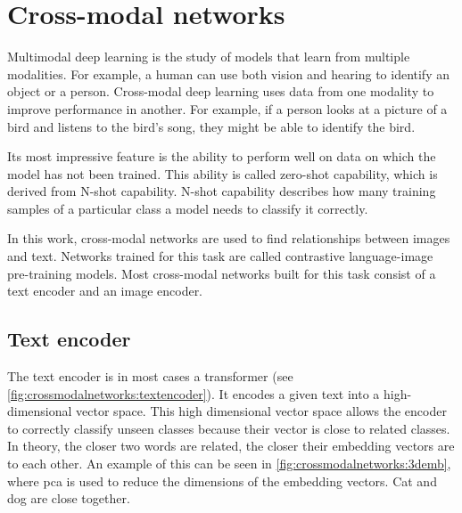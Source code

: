%
%
%


\chapter{Cross-modal networks
    \label{chapter:crossmodalnetworks}}
    Multimodal deep learning is the study of models that learn from multiple modalities.
    For example, a human can use both vision and hearing to identify an object or a person.
    Cross-modal deep learning uses data from one modality to improve performance in another.
    For example, if a person looks at a picture of a bird and listens to the bird's song, they might be able to identify the bird.
    
    Its most impressive feature is the ability to perform well on data on which the model has not been trained.
    This ability is called zero-shot capability, which is derived from N-shot capability.
    N-shot capability describes how many training samples of a particular class a model needs to classify it correctly.

    In this work, cross-modal networks are used to find relationships between images and text.
    Networks trained for this task are called contrastive language-image pre-training models.
    Most cross-modal networks built for this task consist of a text encoder and an image encoder.

    \section{Text encoder}
    The text encoder is in most cases a transformer (see \cref{fig:crossmodalnetworks:textencoder}).
    It encodes a given text into a high-dimensional vector space.
    This high dimensional vector space allows the encoder to correctly classify unseen classes because their vector is close to related classes.
    In theory, the closer two words are related, the closer their embedding vectors are to each other.
    An example of this can be seen in \cref{fig:crossmodalnetworks:3demb}, where \Acrfull{pca} is used to reduce the dimensions of the embedding vectors.
    Cat and dog are close together.

